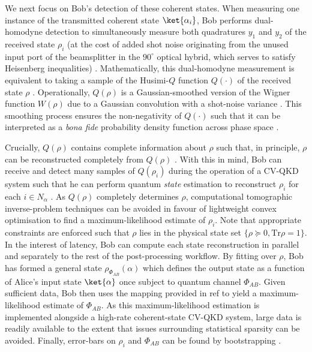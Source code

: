 ﻿\documentclass[12pt]{article}
\begin{document}
We next focus on Bob's detection of these coherent states. When measuring one instance of the transmitted coherent state $\ket{\alpha_i}$, Bob performs dual-homodyne detection to simultaneously measure both quadratures $y_1$ and $y_2$ of the received state $\rho_i$ (at the cost of added shot noise originating from the unused input port of the beamsplitter in the $90^\circ$ optical hybrid, which serves to satisfy Heisenberg inequalities) \cite{Leonhardt-1995, Richter-1998}. Mathematically, this dual-homodyne measurement is equivalent to taking a sample of the Husimi-$Q$ function $Q(\cdot)$ of the received state $\rho$ \cite{Leonhardt-1995}. Operationally, $Q(\rho)$ is a Gaussian-smoothed version of the Wigner function $W(\rho)$ due to a Gaussian convolution with a shot-noise variance \cite{Leonhardt-1995}. This smoothing process ensures the non-negativity of $Q(\cdot)$ such that it can be interpreted as a \textit{bona fide} probability density function across phase space \cite{Leonhardt-1995}.

Crucially, $Q(\rho)$ contains complete information about $\rho$ such that, in principle, $\rho$ can be reconstructed completely from $Q(\rho)$ \cite{Richter-1998}. With this in mind, Bob can receive and detect many samples of $Q(\rho_i)$ during the operation of a CV-QKD system such that he can perform quantum \textit{state} estimation to reconstruct $\rho_i$ for each $i \in N_\alpha$ \cite{Richter-1998, Lvovsky-2009}. As $Q(\rho)$ completely determines $\rho$, computational tomographic inverse-problem techniques can be avoided in favour of lightweight convex optimisation to find a maximum-likelihood estimate of $\rho_i$. Note that appropriate constraints are enforced such that $\rho$ lies in the physical state set $\{\rho \succeq 0, \text{Tr}\rho = 1\}$. In the interest of latency, Bob can compute each state reconstruction in parallel and separately to the rest of the post-processing workflow. By fitting over $\rho$, Bob has formed a general state $\rho_{\Phi_{AB}}(\alpha)$ which defines the output state as a function of Alice's input state $\ket{\alpha}$ once subject to quantum channel $\Phi_{AB}$. Given sufficient data, Bob then uses the mapping provided in ref \cite{Rahimi-Keshari-2011} to yield a maximum-likelihood estimate of $\Phi_{AB}$. As this maximum-likelihood estimation is implemented alongside a high-rate coherent-state CV-QKD system, large data is readily available to the extent that issues surrounding statistical sparsity can be avoided. Finally, error-bars on $\rho_i$ and $\Phi_{AB}$ can be found by bootstrapping \cite{Rahimi-Keshari-2011, Lvovsky-2009}.
\end{document}
